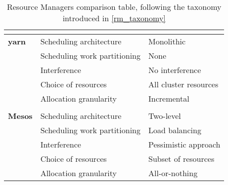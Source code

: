\begin{table}[ht]
\begin{center}
\begin{tabular}{lll}
\multicolumn{3}{c}{} \\ \hline
\multicolumn{1}{l|}{\textbf{\glsdesc*{yarn}}}
                                   & Scheduling architecture      & Monolithic              \\ \cline{2-3} 
\multicolumn{1}{l|}{}              & Scheduling work partitioning & None                    \\ \cline{2-3} 
\multicolumn{1}{l|}{}              & Interference                 & No interference         \\ \cline{2-3} 
\multicolumn{1}{l|}{}              & Choice of resources          & All cluster resources   \\ \cline{2-3} 
\multicolumn{1}{l|}{}              & Allocation granularity       & Incremental              \\ \cline{2-3}

\multicolumn{3}{c}{} \\ \hline
\multicolumn{1}{l|}{\textbf{Mesos \cite{mesos}}} 
                                   & Scheduling architecture      & Two-level               \\ \cline{2-3} 
\multicolumn{1}{l|}{}              & Scheduling work partitioning & Load balancing          \\ \cline{2-3} 
\multicolumn{1}{l|}{}              & Interference                 & Pessimistic approach    \\ \cline{2-3} 
\multicolumn{1}{l|}{}              & Choice of resources          & Subset of resources     \\ \cline{2-3} 
\multicolumn{1}{l|}{}              & Allocation granularity       & All-or-nothing                    

\end{tabular}
\end{center}
\caption{Resource Managers comparison table, following the taxonomy introduced in \autoref{rm_taxonomy}}
\label{rm-comparison-table}
\end{table}